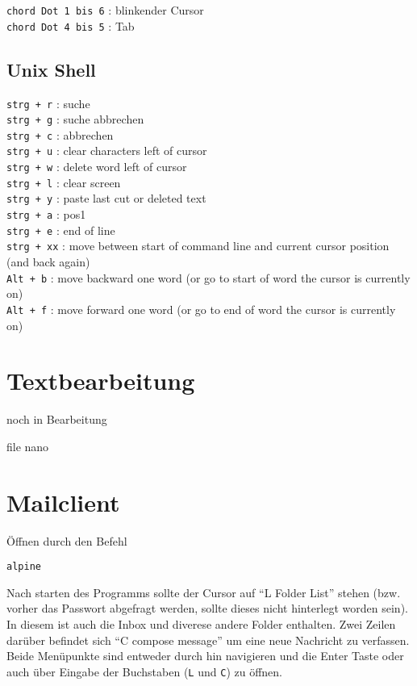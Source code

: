 \documentclass[]{book}
\begin{document}
\texttt{chord\ Dot\ 1\ bis\ 6} : blinkender Cursor\\
\texttt{chord\ Dot\ 4\ bis\ 5} : Tab

\hypertarget{unix-shell}{%
\section{Unix Shell}\label{unix-shell}}

\texttt{strg\ +\ r} : suche\\
\texttt{strg\ +\ g} : suche abbrechen\\
\texttt{strg\ +\ c} : abbrechen\\
\texttt{strg\ +\ u} : clear characters left of cursor\\
\texttt{strg\ +\ w} : delete word left of cursor\\
\texttt{strg\ +\ l} : clear screen\\
\texttt{strg\ +\ y} : paste last cut or deleted text\\
\texttt{strg\ +\ a} : pos1\\
\texttt{strg\ +\ e} : end of line\\
\texttt{strg\ +\ xx} : move between start of command line and current cursor position (and back again)\\
\texttt{Alt\ +\ b} : move backward one word (or go to start of word the cursor is currently on)\\
\texttt{Alt\ +\ f} : move forward one word (or go to end of word the cursor is currently on)

\hypertarget{textbearbeitung}{%
\chapter{Textbearbeitung}\label{textbearbeitung}}

noch in Bearbeitung

file
nano

\hypertarget{mailclient}{%
\chapter{Mailclient}\label{mailclient}}

Öffnen durch den Befehl

\begin{verbatim}
alpine
\end{verbatim}

Nach starten des Programms sollte der Cursor auf ``L Folder List'' stehen (bzw. vorher das Passwort abgefragt werden, sollte dieses nicht hinterlegt worden sein). In diesem ist auch die Inbox und diverese andere Folder enthalten. Zwei Zeilen darüber befindet sich ``C compose message'' um eine neue Nachricht zu verfassen. Beide Menüpunkte sind entweder durch hin navigieren und die Enter Taste oder auch über Eingabe der Buchstaben (\texttt{L} und \texttt{C}) zu öffnen.
\end{document}

